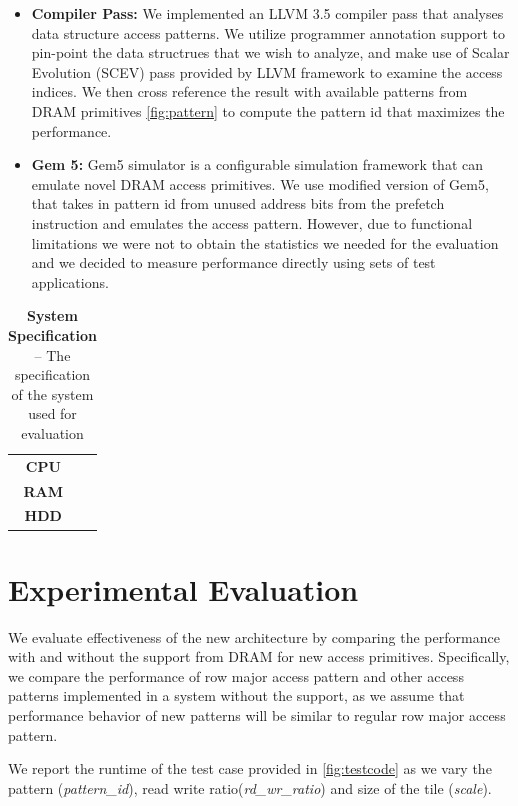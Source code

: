 \documentclass[letterpaper]{article}
\begin{document}
\begin{itemize}

  \item \textbf{Compiler Pass:} We implemented an LLVM 3.5 compiler pass that analyses data structure access patterns. We utilize programmer annotation support to pin-point the data structrues that we wish to analyze, and make use of Scalar Evolution (SCEV) pass provided by LLVM framework to examine the access indices. We then cross reference the result with available patterns from DRAM primitives \ref{fig:pattern} to compute the pattern id that maximizes the performance.
  \item \textbf{Gem 5:} Gem5 simulator is a configurable simulation framework that can emulate novel DRAM access primitives. We use modified version of Gem5, that takes in pattern id from unused address bits from the prefetch instruction and emulates the access pattern. However, due to functional limitations we were not to obtain the statistics we needed for the evaluation and we decided to measure performance directly using sets of test applications.
\end{itemize}


\begin{table}[t]
    \centering
    \begin{tabular}{c|c}
  \textbf{CPU} & \\
    \textbf{RAM} & \\
    \textbf{HDD} & \\

  \end{tabular}
    \caption{
        \textbf{System Specification} --
        The specification of the system used for evaluation
    }
    \label{tab:spec}
\end{table}

\section{Experimental Evaluation}

We evaluate effectiveness of the new architecture by comparing the performance with and without
the support from DRAM for new access primitives. Specifically, we compare the performance
of row major access pattern and other access patterns implemented in a system without the support,
as we assume that performance behavior of new patterns will be similar to regular row major
access pattern.

We report the runtime of the test case provided in \ref{fig:testcode} as we vary the pattern
(\textit{pattern_id}), read write ratio(\textit{rd_wr_ratio}) and size of the tile (\textit{scale}).
\end{document}
